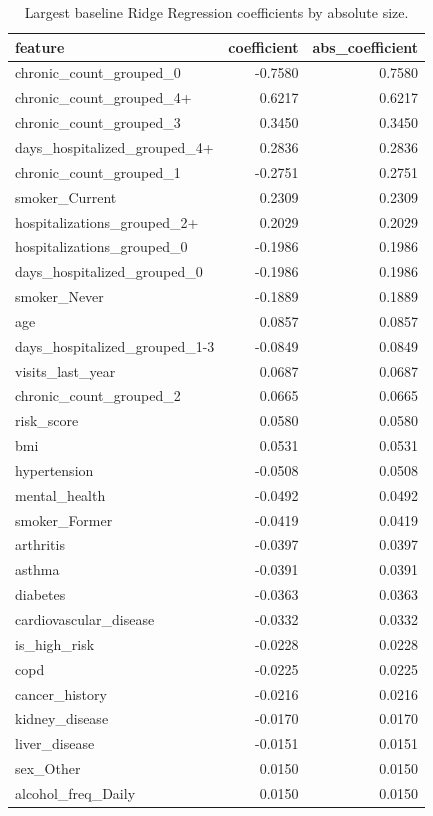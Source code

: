 \begin{table}
\caption{Largest baseline Ridge Regression coefficients by absolute size.}
\label{tab:03-ridge-top-coefficients}
\begin{tabular}{lrr}
\toprule
feature & coefficient & abs_coefficient \\
\midrule
chronic_count_grouped_0 & -0.7580 & 0.7580 \\
chronic_count_grouped_4+ & 0.6217 & 0.6217 \\
chronic_count_grouped_3 & 0.3450 & 0.3450 \\
days_hospitalized_grouped_4+ & 0.2836 & 0.2836 \\
chronic_count_grouped_1 & -0.2751 & 0.2751 \\
smoker_Current & 0.2309 & 0.2309 \\
hospitalizations_grouped_2+ & 0.2029 & 0.2029 \\
hospitalizations_grouped_0 & -0.1986 & 0.1986 \\
days_hospitalized_grouped_0 & -0.1986 & 0.1986 \\
smoker_Never & -0.1889 & 0.1889 \\
age & 0.0857 & 0.0857 \\
days_hospitalized_grouped_1-3 & -0.0849 & 0.0849 \\
visits_last_year & 0.0687 & 0.0687 \\
chronic_count_grouped_2 & 0.0665 & 0.0665 \\
risk_score & 0.0580 & 0.0580 \\
bmi & 0.0531 & 0.0531 \\
hypertension & -0.0508 & 0.0508 \\
mental_health & -0.0492 & 0.0492 \\
smoker_Former & -0.0419 & 0.0419 \\
arthritis & -0.0397 & 0.0397 \\
asthma & -0.0391 & 0.0391 \\
diabetes & -0.0363 & 0.0363 \\
cardiovascular_disease & -0.0332 & 0.0332 \\
is_high_risk & -0.0228 & 0.0228 \\
copd & -0.0225 & 0.0225 \\
cancer_history & -0.0216 & 0.0216 \\
kidney_disease & -0.0170 & 0.0170 \\
liver_disease & -0.0151 & 0.0151 \\
sex_Other & 0.0150 & 0.0150 \\
alcohol_freq_Daily & 0.0150 & 0.0150 \\
\bottomrule
\end{tabular}
\end{table}
